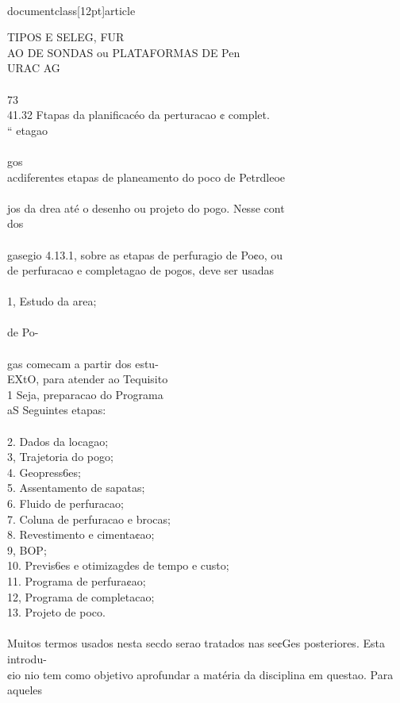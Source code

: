 \\documentclass[12pt]{article}
\begin{document}
TIPOS E SELEG, FUR\\
AO DE SONDAS ou PLATAFORMAS DE Pen\\
URAC AG\\
\\
73\\
41.32 Ftapas da planificacéo da perturacao ¢ complet.\\
“ etagao\\
\\
gos\\
acdiferentes etapas de planeamento do poco de Petrdleoe\\
\\
jos da drea até o desenho ou projeto do pogo. Nesse cont\\
dos\\
\\
gasegio 4.13.1, sobre as etapas de perfuragio de Po¢o, ou\\
de perfuracao e completagao de pogos, deve ser usadas\\
\\
1, Estudo da area;\\
\\
de Po-\\
\\
gas comecam a partir dos estu-\\
EXtO, para atender ao Tequisito\\
1 Seja, preparacao do Programa\\
aS Seguintes etapas:\\
\\
2. Dados da locagao;\\
3, Trajetoria do pogo;\\
4. Geopress6es;\\
5. Assentamento de sapatas;\\
6. Fluido de perfuracao;\\
7. Coluna de perfuracao e brocas;\\
8. Revestimento e cimenta¢ao;\\
9, BOP;\\
10. Previs6es e otimizagdes de tempo e custo;\\
11. Programa de perfura¢ao;\\
12, Programa de completacao;\\
13. Projeto de poco.\\
\\
Muitos termos usados nesta secdo serao tratados nas se¢Ges posteriores. Esta introdu-\\
¢io nio tem como objetivo aprofundar a matéria da disciplina em questao. Para aqueles\\
\end{document}
